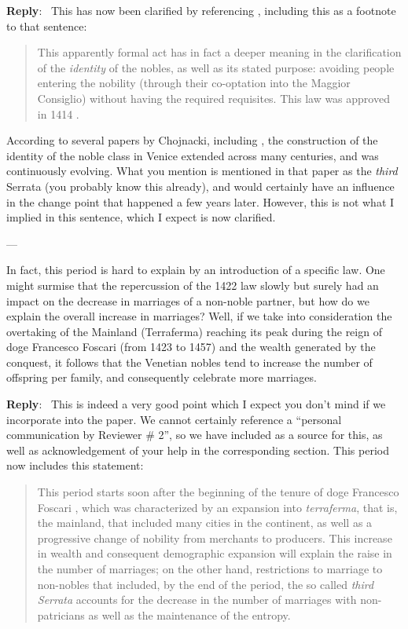 \documentclass[11pt]{article}
\newcounter{reviewer}
\newcounter{point}[reviewer]
\renewcommand{\thepoint}{P\,\thereviewer.\arabic{point}}
\newenvironment{point}
   {\refstepcounter{point} \bigskip \noindent {\textbf{Reviewer~Point~\thepoint} } ---\ }
   {\par }
\newenvironment{reply}
   {\medskip \noindent \begin{sf}\textbf{Reply}:\  }
   {\medskip \end{sf}}
\begin{document}
\begin{reply}
This has now been clarified by referencing \cite{second:serrata}, including this
as a footnote to that sentence:

\begin{quote}
  This apparently formal act has in fact a deeper meaning in the clarification
  of the \emph{identity} of the nobles, as well as its stated purpose: avoiding
  people entering the nobility (through their co-optation into the Maggior
  Consiglio) without having the required requisites. This law was approved in
  1414 \cite{second:serrata}.
\end{quote}

According to several papers by Chojnacki, including \cite{chojnacki00}, the
construction of the identity of the noble class in Venice extended across many
centuries, and was continuously evolving. What you mention is mentioned in that
paper as the {\em third} Serrata (you probably know this already), and would
certainly have an influence in the change point that happened a few years
later. However, this is not what I implied in this sentence, which I expect is
now clarified.
\end{reply}

\begin{point}

  In fact, this period is hard to explain by an introduction of a specific
  law. One might surmise that the repercussion of the 1422 law slowly but surely
  had an impact on the decrease in marriages of a non-noble partner, but how do
  we explain the overall increase in marriages? Well, if we take into
  consideration the overtaking of the Mainland (Terraferma) reaching its peak
  during the reign of doge Francesco Foscari (from 1423 to 1457) and the wealth
  generated by the conquest, it follows that the Venetian nobles tend to
  increase the number of offspring per family, and consequently celebrate more
  marriages.
\end{point}

\begin{reply}
This is indeed a very good point which I expect you don't mind if we incorporate
into the paper. We cannot certainly reference a ``personal communication by
Reviewer \# 2'', so we have included \cite{law:mainland} as a source for this,
as well as acknowledgement of your help in the corresponding section. This
period now includes this statement:\begin{quote}
  This period starts soon after the beginning of the tenure of doge Francesco
  Foscari \cite{law:mainland}, which was characterized by an expansion into {\em
    terraferma}, that is, the mainland, that included many cities in the
  continent, as well as a progressive change of nobility from merchants to
  producers. This increase in wealth and consequent demographic expansion will
  explain the raise in the number of marriages; on the other hand, restrictions
  to marriage to non-nobles that included, by the end of the period, the so
  called {\em third Serrata} \cite{chojnacki00} accounts for the decrease in the
  number of marriages with non-patricians as well as the maintenance of the
  entropy.
\end{quote}
\end{reply}
\end{document}
